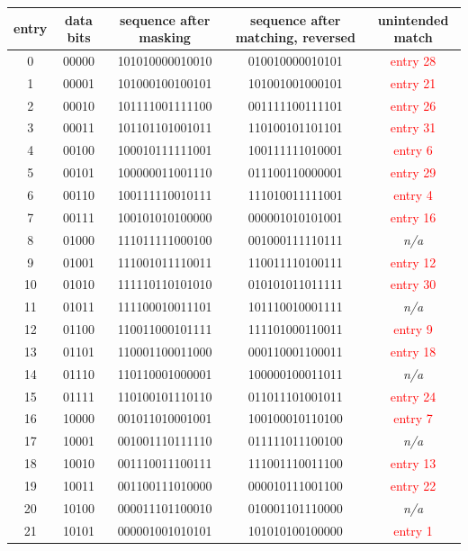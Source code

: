 \documentclass[a4paper,twoside]{article}
\newcommand{\bad}[1]{\textcolor{red}{#1}}
\begin{document}
\begin{table}[h!]
\centering
\begin{tabular}{|c|c|c|c|c|}
\hline
entry & data bits & sequence after masking & sequence after matching, reversed & unintended match \\
\hline
 0 & 00000 & 101010000010010 & 010010000010101 & \bad{entry 28} \\
 1 & 00001 & 101000100100101 & 101001001000101 & \bad{entry 21} \\
 2 & 00010 & 101111001111100 & 001111100111101 & \bad{entry 26} \\
 3 & 00011 & 101101101001011 & 110100101101101 & \bad{entry 31} \\
 4 & 00100 & 100010111111001 & 100111111010001 & \bad{entry 6} \\
 5 & 00101 & 100000011001110 & 011100110000001 & \bad{entry 29} \\
 6 & 00110 & 100111110010111 & 111010011111001 & \bad{entry 4} \\
 7 & 00111 & 100101010100000 & 000001010101001 & \bad{entry 16} \\
 8 & 01000 & 111011111000100 & 001000111110111 & \textit{n/a} \\
 9 & 01001 & 111001011110011 & 110011110100111 & \bad{entry 12} \\
10 & 01010 & 111110110101010 & 010101011011111 & \bad{entry 30} \\
11 & 01011 & 111100010011101 & 101110010001111 & \textit{n/a} \\
12 & 01100 & 110011000101111 & 111101000110011 & \bad{entry 9} \\
13 & 01101 & 110001100011000 & 000110001100011 & \bad{entry 18} \\
14 & 01110 & 110110001000001 & 100000100011011 & \textit{n/a} \\
15 & 01111 & 110100101110110 & 011011101001011 & \bad{entry 24} \\
16 & 10000 & 001011010001001 & 100100010110100 & \bad{entry 7} \\
17 & 10001 & 001001110111110 & 011111011100100 & \textit{n/a} \\
18 & 10010 & 001110011100111 & 111001110011100 & \bad{entry 13} \\
19 & 10011 & 001100111010000 & 000010111001100 & \bad{entry 22} \\
20 & 10100 & 000011101100010 & 010001101110000 & \textit{n/a} \\
21 & 10101 & 000001001010101 & 101010100100000 & \bad{entry 1} \\

\end{tabular}
\end{table}
\end{document}
